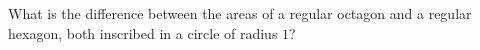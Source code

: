 What is the difference between the areas of a regular octagon and a regular hexagon, both inscribed in a circle of radius $1$?
